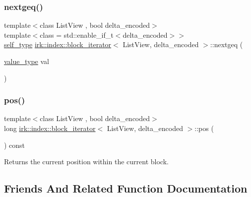 \subsubsection{\texorpdfstring{nextgeq()}{nextgeq()}}
{\footnotesize\ttfamily template$<$class List\+View , bool delta\+\_\+encoded$>$ \\
template$<$class  = std\+::enable\+\_\+if\+\_\+t$<$delta\+\_\+encoded$>$$>$ \\
\mbox{\hyperlink{classirk_1_1index_1_1block__iterator_a338ee8fee726492e9f8bbad4b4d75766}{self\+\_\+type}} \mbox{\hyperlink{classirk_1_1index_1_1block__iterator}{irk\+::index\+::block\+\_\+iterator}}$<$ List\+View, delta\+\_\+encoded $>$\+::nextgeq (\begin{DoxyParamCaption}\item[{\mbox{\hyperlink{classirk_1_1index_1_1block__iterator_a4d6c5b58cedd871e8a8f235e425e8587}{value\+\_\+type}}}]{val }\end{DoxyParamCaption})\hspace{0.3cm}{\ttfamily [inline]}}

\mbox{\label{classirk_1_1index_1_1block__iterator_a36dd1b7e5b2b3d3b8865030c239d4ac9}} 
\subsubsection{\texorpdfstring{pos()}{pos()}}
{\footnotesize\ttfamily template$<$class List\+View , bool delta\+\_\+encoded$>$ \\
long \mbox{\hyperlink{classirk_1_1index_1_1block__iterator}{irk\+::index\+::block\+\_\+iterator}}$<$ List\+View, delta\+\_\+encoded $>$\+::pos (\begin{DoxyParamCaption}{ }\end{DoxyParamCaption}) const\hspace{0.3cm}{\ttfamily [inline]}}



Returns the current position within the current block. 



\subsection{Friends And Related Function Documentation}
\mbox{\label{classirk_1_1index_1_1block__iterator_ac09f73e325921cc50ebcd96bed0f8096}} 
